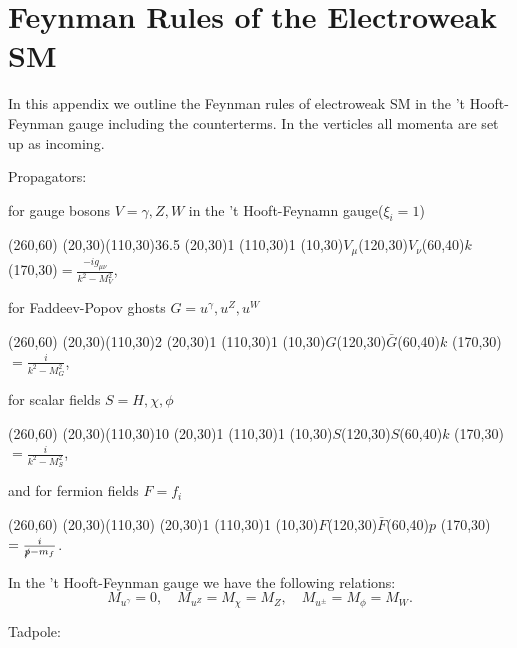 \chapter{Feynman Rules of the Electroweak SM} 

In this appendix we outline the Feynman rules of electroweak SM in the 't Hooft-Feynman gauge including the counterterms. In the verticles all momenta are set up as incoming. 

	
Propagators:

for gauge bosons $V=\gamma, Z, W$ in the 't Hooft-Feynamn gauge($\xi_i=1$)	

\begin{axopicture}(260,60) %
	\Photon(20,30)(110,30){3}{6.5}
	\Vertex(20,30){1}
	\Vertex(110,30){1}
	\Text(10,30){$V_\mu$}\Text(120,30){$V_\nu$}\Text(60,40){$k$}
	\Text(170,30){$=\frac{-ig_{\mu\nu}}{k^2-M_V^2}$,}	
\end{axopicture}

for Faddeev-Popov ghosts $G=u^\gamma,u^Z,u^W$

\begin{axopicture}(260,60) %
	\DashLine[arrow](20,30)(110,30){2}
	\Vertex(20,30){1}
	\Vertex(110,30){1}
	\Text(10,30){$G$}\Text(120,30){$\bar{G}$}\Text(60,40){$k$}
	\Text(170,30){$=\frac{i}{k^2-M_G^2}$,}	
\end{axopicture}

for scalar fields $S=H,\chi,\phi$

\begin{axopicture}(260,60) %
	\DashLine[arrow](20,30)(110,30){10}
	\Vertex(20,30){1}
	\Vertex(110,30){1}
	\Text(10,30){$S$}\Text(120,30){${S}$}\Text(60,40){$k$}
	\Text(170,30){$=\frac{i}{k^2-M_S^2}$,}	
\end{axopicture}

and for fermion fields $F=f_i$

\begin{axopicture}(260,60)
	\Line[arrow](20,30)(110,30)
	\Vertex(20,30){1}
	\Vertex(110,30){1}
	\Text(10,30){$F$}\Text(120,30){$\bar{F}$}\Text(60,40){$p$}
	\Text(170,30){$=\frac{i}{\slashed{p}-m_f}$.}	
\end{axopicture}

In the 't Hooft-Feynman gauge we have the following relations:
\begin{equation}
M_{u^\gamma}=0, \quad M_{u^Z}=M_\chi=M_Z, \quad M_{u^\pm}=M_\phi=M_W.
\end{equation}

Tadpole:

